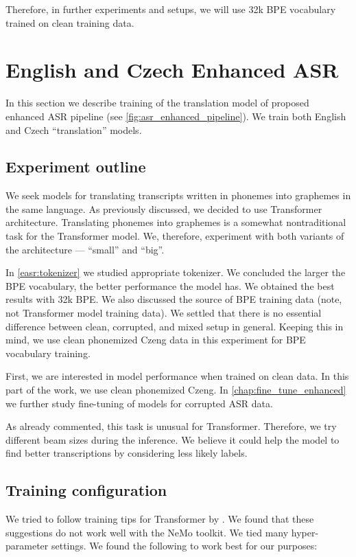 Therefore, in further experiments and setups, we will use 32k BPE vocabulary trained on clean training data.









\section{English and Czech Enhanced ASR}
\label{easr:english}
In this section we describe training of the translation model of proposed enhanced ASR pipeline (see \cref{fig:asr_enhanced_pipeline}). We train both English and Czech ``translation'' models.

\subsection{Experiment outline}
\label{easr:outline}
We seek models for translating transcripts written in phonemes into graphemes in the same language. As previously discussed, we decided to use Transformer architecture. Translating phonemes into graphemes is a somewhat nontraditional task for the Transformer model. We, therefore, experiment with both variants of the architecture --- ``small'' and ``big''. 

In \cref{easr:tokenizer} we studied appropriate tokenizer. We concluded the larger the BPE vocabulary, the better performance the model has. We obtained the best results with 32k BPE. We also discussed the source of BPE training data (note, not Transformer model training data). We settled that there is no essential difference between clean, corrupted, and mixed setup in general. Keeping this in mind, we use clean phonemized Czeng data in this experiment for BPE vocabulary training. 

First, we are interested in model performance when trained on clean data. In this part of the work, we use clean phonemized Czeng. In \cref{chap:fine_tune_enhanced} we further study fine-tuning of models for corrupted ASR data.

As already commented, this task is unusual for Transformer. Therefore, we try different beam sizes during the inference. We believe it could help the model to find better transcriptions by considering less likely labels.

\subsection{Training configuration}
\label{easr:training}
We tried to follow training tips for Transformer by . We found that these suggestions do not work well with the NeMo toolkit. We tied many hyper-parameter settings. We found the following to work best for our purposes:

